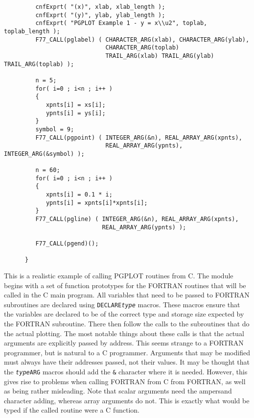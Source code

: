 \documentclass[twoside,11pt]{article}
\newcommand{\htmlref}[2]{#1}
\renewcommand{\_}{\texttt{\symbol{95}}}
\begin{document}
{\begin{verbatim}
         cnfExprt( "(x)", xlab, xlab_length );
         cnfExprt( "(y)", ylab, ylab_length );
         cnfExprt( "PGPLOT Example 1 - y = x\\u2", toplab, toplab_length );
         F77_CALL(pglabel) ( CHARACTER_ARG(xlab), CHARACTER_ARG(ylab),
                             CHARACTER_ARG(toplab)
                             TRAIL_ARG(xlab) TRAIL_ARG(ylab) TRAIL_ARG(toplab) );

         n = 5;
         for( i=0 ; i<n ; i++ )
         {
            xpnts[i] = xs[i];
            ypnts[i] = ys[i];
         }
         symbol = 9;
         F77_CALL(pgpoint) ( INTEGER_ARG(&n), REAL_ARRAY_ARG(xpnts),
                             REAL_ARRAY_ARG(ypnts), INTEGER_ARG(&symbol) );

         n = 60;
         for( i=0 ; i<n ; i++ )
         {
            xpnts[i] = 0.1 * i;
            ypnts[i] = xpnts[i]*xpnts[i];
         }
         F77_CALL(pgline) ( INTEGER_ARG(&n), REAL_ARRAY_ARG(xpnts),
                            REAL_ARRAY_ARG(ypnts) );

         F77_CALL(pgend)();

      }
\end{verbatim} }

This is a realistic example of calling PGPLOT routines from C\@. The module
begins with a set of function prototypes for the FORTRAN routines that will be
called in the C main program. All variables that need to be passed to FORTRAN
subroutines are declared using 
\htmlref{\texttt{DECLARE\_\-\textit{type}}}{DECLARE_type}\/ 
macros. 
These macros ensure that the variables are declared to be of the correct type
and storage size expected by the FORTRAN subroutine.
There then follow the calls to the subroutines that do the actual plotting. 
The most notable things about these calls is that the actual arguments are 
explicitly passed by address. 
This seems strange to a FORTRAN programmer, but is natural to a C programmer. 
Arguments that may be modified must always have their addresses passed, not 
their values.
It may be thought that the 
\htmlref{\texttt{\textit{type}\_ARG}}{type_ARG}
macros should add the \texttt{\&} character where it is needed. 
However, this gives rise to problems when calling
FORTRAN from C from FORTRAN, as well as being rather misleading. Note that
scalar arguments need the ampersand character adding, whereas array arguments
do not. This is exactly what would be typed if the called routine were a C
function.
\end{document}
